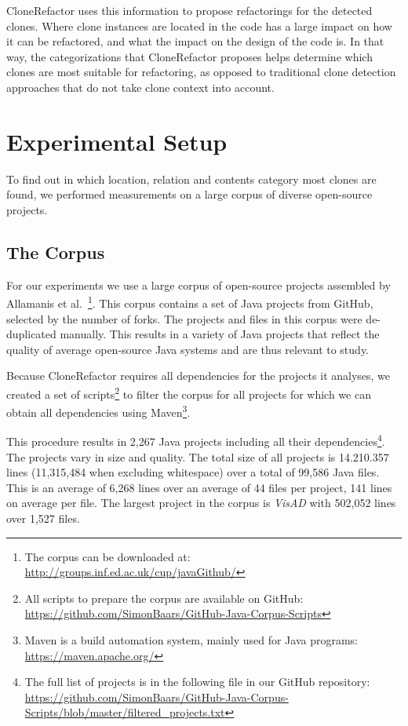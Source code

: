 \documentclass[runningheads]{llncs}
\begin{document}
CloneRefactor uses this information to propose refactorings for the detected clones. Where clone instances are located in the code has a large impact on how it can be refactored, and what the impact on the design of the code is. In that way, the categorizations that CloneRefactor proposes helps determine which clones are most suitable for refactoring, as opposed to traditional clone detection approaches that do not take clone context into account.

\section{Experimental Setup}
To find out in which location, relation and contents category most clones are found, we performed measurements on a large corpus of diverse open-source projects.

\subsection{The Corpus}\label{chap:corpus}
For our experiments we use a large corpus of open-source projects assembled by Allamanis et al.~\cite{githubCorpus2013}\footnote{The corpus can be downloaded at: \url{http://groups.inf.ed.ac.uk/cup/javaGithub/}}. This corpus contains a set of Java projects from GitHub, selected by the number of forks. The projects and files in this corpus were de-duplicated manually. This results in a variety of Java projects that reflect the quality of average open-source Java systems and are thus relevant to study.

Because CloneRefactor requires all dependencies for the projects it analyses, we created a set of scripts\footnote{All scripts to prepare the corpus are available on GitHub: \url{https://github.com/SimonBaars/GitHub-Java-Corpus-Scripts}} to filter the corpus for all projects for which we can obtain all dependencies using Maven\footnote{Maven is a build automation system, mainly used for Java programs: \url{https://maven.apache.org/}}.

This procedure results in 2,267 Java projects including all their dependencies\footnote{The full list of projects is in the following file in our GitHub repository: \url{https://github.com/SimonBaars/GitHub-Java-Corpus-Scripts/blob/master/filtered_projects.txt}}. The projects vary in size and quality. The total size of all projects is 14.210.357 lines (11,315,484 when excluding whitespace) over a total of 99,586 Java files. This is an average of 6,268 lines over an average of 44 files per project, 141 lines on average per file. The largest project in the corpus is \textit{VisAD} with 502,052 lines over 1,527 files.
\end{document}
